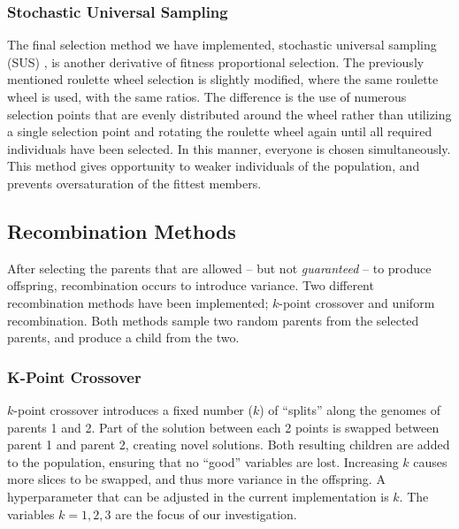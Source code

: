 \documentclass{article}
\begin{document}
\subsubsection*{Stochastic Universal Sampling}
\label{subsubsec:ga_sel_sus}
\vspace{-0.2cm}
The final selection method we have implemented, stochastic universal sampling (SUS) \cite{sus}, is another derivative of fitness proportional selection.
The previously mentioned roulette wheel selection is slightly modified, where the same roulette wheel is used, with the same ratios.
The difference is the use of numerous selection points that are evenly distributed around the wheel rather than utilizing a single selection point and rotating the roulette wheel again until all required individuals have been selected.
In this manner, everyone is chosen simultaneously.
This method gives opportunity to weaker individuals of the population, and prevents oversaturation of the fittest members.


\newpage


\subsection{Recombination Methods}
\label{subsec:ga_rec}

After selecting the parents that are allowed -- but not \textit{guaranteed} -- to produce offspring, recombination occurs to introduce variance.
Two different recombination methods have been implemented; $k$-point crossover and uniform recombination.
Both methods sample two random parents from the selected parents, and produce a child from the two.

\subsubsection*{K-Point Crossover}
\label{subsubsec:ga_rec_kp}
\vspace{-0.2cm}
$k$-point crossover introduces a fixed number ($k$) of ``splits'' along the genomes of parents 1 and 2.
Part of the solution between each 2 points is swapped between parent 1 and parent 2, creating novel solutions.
Both resulting children are added to the population, ensuring that no ``good'' variables are lost.
Increasing $k$ causes more slices to be swapped, and thus more variance in the offspring.
A hyperparameter that can be adjusted in the current implementation is $k$. 
The variables $k=1, 2, 3$ are the focus of our investigation.
\end{document}
